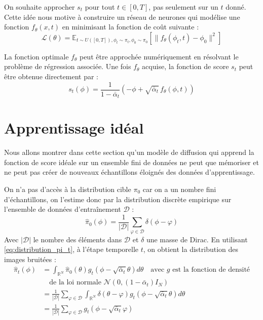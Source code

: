 \documentclass[a4paper,10pt]{article}
\theoremstyle{definition} %
\theoremstyle{definition} %
\theoremstyle{definition} %
\theoremstyle{definition} %
\newcommand{\argmin}{\mathop{\mathrm{argmin}}}
\begin{document}

On souhaite approcher $s_t$ pour tout $t \in [0,T]$, pas seulement sur un $t$ donné. Cette idée nous motive à construire un réseau de neurones qui modélise une fonction $f_\theta(x,t)$ en minimisant la fonction de coût suivante :
\[
\mathcal{L}(\theta) = \mathbb{E}_{t \sim U([0,T]), \phi_t \sim \pi_t, \phi_0 \sim \pi_0} \left[ \| f_\theta(\phi_t,t) - \phi_ 0\|^2 \right]
\]

La fonction optimale $f_\theta$ peut être approchée numériquement en résolvant le problème de régression associée. Une fois $f_\theta$ acquise, la fonction de score $s_t$ peut être obtenue directement par :
\[
s_t(\phi)= \frac{1}{1 - \bar \alpha_t} \left( -\phi + \sqrt{\bar \alpha_t} \, f_\theta(\phi,t) \right)
\]


\section{Apprentissage idéal}
Nous allons montrer dans cette section qu'un modèle de diffusion qui apprend la fonction de score idéale sur un ensemble fini de données ne peut que mémoriser et ne peut pas créer de nouveaux échantillons éloignés des données d'apprentissage.

On n'a pas d'accès à la distribution cible $\pi_0$ car on a un nombre fini d'échantillons, on l'estime donc par la distribution discrète empirique sur l'ensemble de données d'entraînement $\mathcal{D}$ :
\begin{equation*}
    \hat{\pi}_0(\phi) = \frac{1}{|\mathcal{D}|} \sum\limits_{\varphi \in \mathcal{D}} \delta(\phi - \varphi)
\end{equation*}
Avec $|\mathcal{D}|$ le nombre des éléments dans $\mathcal{D}$ et $\delta$ une masse de Dirac.
En utilisant \cref{eq:distribution_pi_t}, à l'étape temporelle $t$, on obtient la distribution des images bruitées :
\begin{align*}
\hat{\pi}_t(\phi) &= \int_{\mathbb{R}^N} \hat{\pi}_0(\theta) g_t(\phi - \sqrt{\bar \alpha_t}\theta) d\theta \quad \text{avec } g \text{ est la fonction de densité} \\
&\quad \text{de la loi normale } \mathcal{N}(0, (1-\bar \alpha_t)I_N) \\
&= \frac{1}{|\mathcal{D}|} \sum\limits_{\varphi \in \mathcal{D}} \int_{\mathbb{R}^N} \delta(\theta - \varphi) g_t(\phi - \sqrt{\bar \alpha_t}\theta) d\theta \\
&= \frac{1}{|\mathcal{D}|} \sum\limits_{\varphi \in \mathcal{D}} g_t(\phi - \sqrt{\bar \alpha_t}\varphi)
\end{align*}
\end{document}
